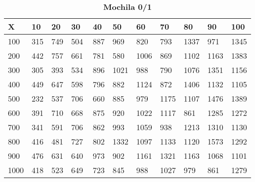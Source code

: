 \documentclass[10pt,letterpaper]{article}
\begin{document}
\newpage 
{}
\begin{center}
\begin{table}\renewcommand{\arraystretch}{2.5}
\caption{\large \textbf{Mochila 0/1}}
\centering
\begin{tabular} { |m{0.5cm}|m{1.3cm}|m{1.3cm}|m{1.3cm}|m{1.3cm}|m{1.3cm}|m{1.3cm}|m{1.3cm}|m{1.3cm}|m{1.3cm}|m{1.3cm}|} 
\hline
\rowcolor{Gray}
\centering \textbf{X} & \centering \textbf{10} & \centering \textbf{20} & \centering \textbf{30}\ & \centering \textbf{40} & \centering \textbf{50} & \centering \textbf{60}\ & \centering \textbf{70} & \centering \textbf{80} & \centering \textbf{90}\ & \textbf{100} \\\hline
\cellcolor{Gray}100 & \Large 315 & \Large 749 & \Large 504 & \Large 887 & \Large 969 & \Large 820 & \Large 793 & \Large 1337 & \Large 971 & \Large 1345 \\
\hline
\cellcolor{Gray}200 & \Large 442 & \Large 757 & \Large 661 & \Large 781 & \Large 580 & \Large 1006 & \Large 869 & \Large 1102 & \Large 1163 & \Large 1383 \\
\hline
\cellcolor{Gray}300 & \Large 305 & \Large 393 & \Large 534 & \Large 896 & \Large 1021 & \Large 988 & \Large 790 & \Large 1076 & \Large 1351 & \Large 1156 \\
\hline
\cellcolor{Gray}400 & \Large 449 & \Large 647 & \Large 598 & \Large 796 & \Large 882 & \Large 1124 & \Large 872 & \Large 1406 & \Large 1132 & \Large 1105 \\
\hline
\cellcolor{Gray}500 & \Large 232 & \Large 537 & \Large 706 & \Large 660 & \Large 885 & \Large 979 & \Large 1175 & \Large 1107 & \Large 1476 & \Large 1389 \\
\hline
\cellcolor{Gray}600 & \Large 391 & \Large 710 & \Large 668 & \Large 875 & \Large 920 & \Large 1022 & \Large 1117 & \Large 861 & \Large 1285 & \Large 1272 \\
\hline
\cellcolor{Gray}700 & \Large 341 & \Large 591 & \Large 706 & \Large 862 & \Large 993 & \Large 1059 & \Large 938 & \Large 1213 & \Large 1310 & \Large 1130 \\
\hline
\cellcolor{Gray}800 & \Large 416 & \Large 481 & \Large 727 & \Large 802 & \Large 1332 & \Large 1097 & \Large 1133 & \Large 1120 & \Large 1573 & \Large 1292 \\
\hline
\cellcolor{Gray}900 & \Large 476 & \Large 631 & \Large 640 & \Large 973 & \Large 902 & \Large 1161 & \Large 1321 & \Large 1163 & \Large 1068 & \Large 1101 \\
\hline
\cellcolor{Gray}1000 & \Large 418 & \Large 523 & \Large 649 & \Large 723 & \Large 845 & \Large 988 & \Large 1027 & \Large 979 & \Large 861 & \Large 1279 \\
\hline
\end{tabular} \\
\end{table}
\end{center}
\end{document}
